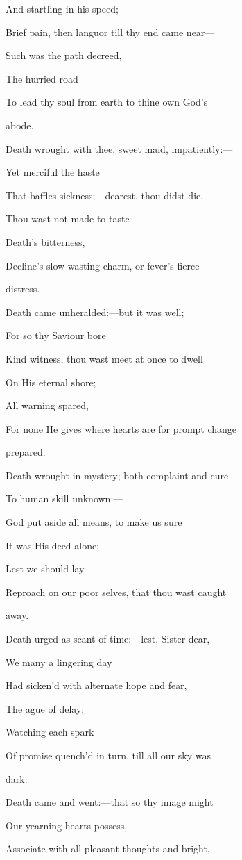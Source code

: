 And startling
in his speed;—

Brief pain, then languor till thy end came near—

Such was the
path decreed,

The hurried road

To lead thy soul from earth to thine own God's

abode.

Death wrought with thee, sweet maid, impatiently:—

Yet merciful
the haste

That baffles sickness;—dearest, thou didst die,

Thou wast not
made to taste

Death's bitterness,

Decline's slow-wasting charm, or fever's fierce

distress.

Death came unheralded:—but it was well;

For so thy
Saviour bore

Kind witness, thou wast meet at once to dwell

On His
eternal shore;

All warning spared,

For none He gives where hearts are for prompt change

prepared.

Death wrought in mystery; both complaint and cure

To human
skill unknown:—

God put aside all means, to make us sure

It was His
deed alone;

Lest we should lay

Reproach on our poor selves, that thou wast caught

away.

Death urged as scant of time:—lest, Sister dear,

We many a
lingering day

Had sicken'd with alternate hope and fear,

The ague of
delay;

Watching each spark

Of promise quench'd in turn, till all our sky was

dark. 

Death came and went:—that so thy image might

Our yearning
hearts possess,

Associate with all pleasant thoughts and bright,

